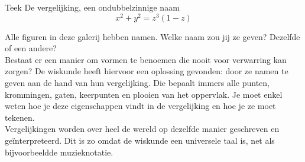 \begin{surferPage}{Teek}
De vergelijking, een ondubbelzinnige naam \\
\smallskip
\[x^2 + y^2	= z^3	(1 - z) \]


\singlespacing
Alle figuren in deze galerij hebben namen. Welke naam zou jij ze geven? Dezelfde of een andere?\\
\vspace{0.3cm}
Bestaat er een manier om vormen te benoemen die nooit voor verwarring kan zorgen? De wiskunde heeft hiervoor een oplossing gevonden: door ze namen te geven aan de hand van hun vergelijking. Die bepaalt immers alle punten, krommingen, gaten, keerpunten en plooien van het oppervlak. Je moet enkel weten hoe je deze eigenschappen vindt in de vergelijking en hoe je ze moet tekenen.\\
\vspace{0.3cm}
Vergelijkingen worden over heel de wereld op dezelfde manier geschreven en ge\"interpreteerd. Dit is zo omdat de wiskunde een universele taal is, net als bijvoorbeeldde muzieknotatie. 
\end{surferPage}
